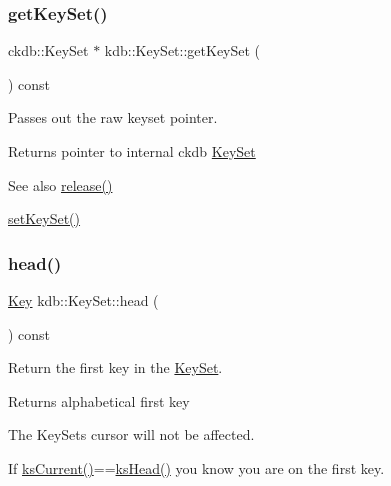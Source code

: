 \subsubsection{\texorpdfstring{get\+Key\+Set()}{getKeySet()}}
{\footnotesize\ttfamily ckdb\+::\+Key\+Set $\ast$ kdb\+::\+Key\+Set\+::get\+Key\+Set (\begin{DoxyParamCaption}{ }\end{DoxyParamCaption}) const\hspace{0.3cm}{\ttfamily [inline]}}



Passes out the raw keyset pointer. 

\begin{DoxyReturn}{Returns}
pointer to internal ckdb \hyperlink{classkdb_1_1KeySet}{Key\+Set}
\end{DoxyReturn}
\begin{DoxySeeAlso}{See also}
\hyperlink{classkdb_1_1KeySet_a2987b3fb1b12196399650726f1c18f02}{release()} 

\hyperlink{classkdb_1_1KeySet_a9f3ec4eebe304185527b08a6fa01b77c}{set\+Key\+Set()} 
\end{DoxySeeAlso}
\mbox{\label{classkdb_1_1KeySet_a1aca3689ed08cbc909976cdf874cfb59}} 
\subsubsection{\texorpdfstring{head()}{head()}}
{\footnotesize\ttfamily \hyperlink{classkdb_1_1Key}{Key} kdb\+::\+Key\+Set\+::head (\begin{DoxyParamCaption}{ }\end{DoxyParamCaption}) const\hspace{0.3cm}{\ttfamily [inline]}}



Return the first key in the \hyperlink{classkdb_1_1KeySet}{Key\+Set}. 

\begin{DoxyReturn}{Returns}
alphabetical first key
\end{DoxyReturn}
The Key\+Sets cursor will not be affected.

If \hyperlink{group__keyset_ga4287b9416912c5f2ab9c195cb74fb094}{ks\+Current()}==\hyperlink{group__keyset_gae7dbf3aef70e67b5328475eb3d1f92f5}{ks\+Head()} you know you are on the first key.


